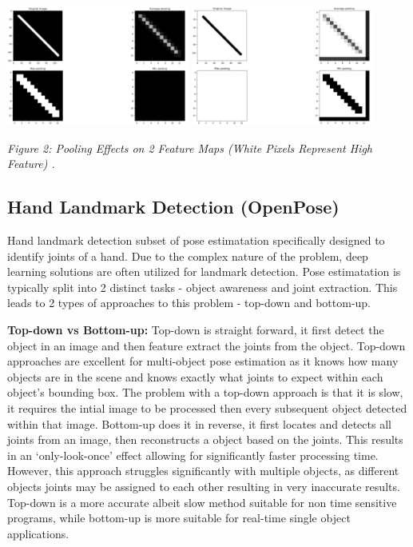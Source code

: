 \documentclass[11pt]{article}
\def\paraskip{\vskip 0.4cm}
\begin{document}
        \begin{center}
            \includegraphics[width=6cm]{blackpool.png}
            \hspace{2cm}
            \includegraphics[width=6cm]{whitepool.png}
            \\
            \raggedright \textit{
            Figure 2: Pooling Effects on 2 Feature Maps (White Pixels Represent High Feature) \cite{poolingdiff}.
            }
        \end{center}

    \subsection{Hand Landmark Detection (OpenPose)}
        Hand landmark detection subset of pose estimatation specifically designed to identify joints of a hand. Due to the complex nature of the problem, deep learning solutions are often utilized for landmark detection. Pose estimatation is typically split into 2 distinct tasks - object awareness and joint extraction. This leads to 2 types of approaches to this problem - top-down and bottom-up. 
        
        \paraskip

        \noindent\textbf{Top-down vs Bottom-up: } Top-down is straight forward, it first detect the object in an image and then feature extract the joints from the object. Top-down approaches are excellent for multi-object pose estimation as it knows how many objects are in the scene and knows exactly what joints to expect within each object's bounding box. The problem with a top-down approach is that it is slow, it requires the intial image to be processed then every subsequent object detected within that image. Bottom-up does it in reverse, it first locates and detects all joints from an image, then reconstructs a object based on the joints. This results in an `only-look-once' effect allowing for significantly faster processing time. However, this approach struggles significantly with multiple objects, as different objects joints may be assigned to each other resulting in very inaccurate results. Top-down is a more accurate albeit slow method suitable for non time sensitive programs, while bottom-up is more suitable for real-time single object applications. 
\end{document}
